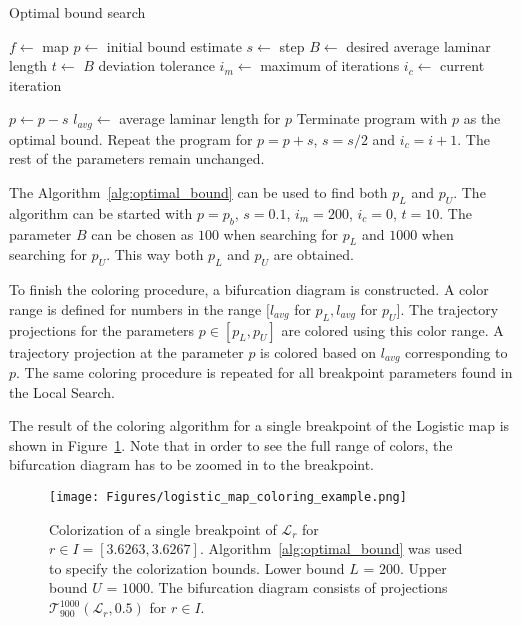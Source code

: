 \begin{algorithm}[!h]
    \caption{Optimal bound search}
    \label{alg:optimal_bound}
    \begin{algorithmic}[1]
        \Statex $f \gets$ map
        \Statex $p \gets$ initial bound estimate
        \Statex $s \gets$ step
        \Statex $B \gets$ desired average laminar length
        \Statex $t \gets$ $B$ deviation tolerance
        \Statex $i_{m} \gets$ maximum of iterations
        \Statex $i_{c} \gets$ current iteration

            \State $p \gets p - s$
            \State $l_{avg} \gets$ average laminar length for $p$
                \State Terminate program with $p$ as the optimal bound.
            \EndIf
                \State Repeat the program for $p = p+s$, $s = s/2$ and $i_{c} = i+1$. The rest of the parameters remain unchanged.
            \EndIf
        \EndFor
    \end{algorithmic}
\end{algorithm}

The Algorithm~\ref{alg:optimal_bound} can be used to find both $p_L$ and $p_U$.
The algorithm can be started with $p = p_b$, $s = 0.1$, $i_{m} = 200$, $i_{c} = 0$, $t = 10$.
The parameter $B$ can be chosen as $100$ when searching for $p_{L}$ and $1000$ when searching for $p_{U}$.
This way both $p_L$ and $p_U$ are obtained.
\par
To finish the coloring procedure, a bifurcation diagram is constructed.
A color range is defined for numbers in the range $[ l_{avg}$ for $p_L, l_{avg}$ for $p_U ]$.
The trajectory projections for the parameters $p \in [ p_L, p_U ]$ are colored using this color range.
A trajectory projection at the parameter $p$ is colored based on $l_{avg}$ corresponding to $p$.
The same coloring procedure is repeated for all breakpoint parameters found in the Local Search.
\par
The result of the coloring algorithm for a single breakpoint of the Logistic map is shown in Figure~\ref{fig:coloring_example}.
Note that in order to see the full range of colors, the bifurcation diagram has to be zoomed in to the breakpoint.

\begin{figure}[!h]
    \centering
    \texttt{[image: Figures/logistic\_map\_coloring\_example.png]}
    \caption{
        Colorization of a single breakpoint of $\mathcal{L}_{r}$ for $r \in I = [ 3.6263, 3.6267 ]$.
        Algorithm~\ref{alg:optimal_bound} was used to specify the colorization bounds.
        Lower bound $L$ = $200$.
        Upper bound $U$ = $1000$.
        The bifurcation diagram consists of projections $\mathcal{T}_{900}^{1000}(\mathcal{L}_{r}, 0.5)$ for $r \in I$.
    }
    \label{fig:coloring_example}
\end{figure}

